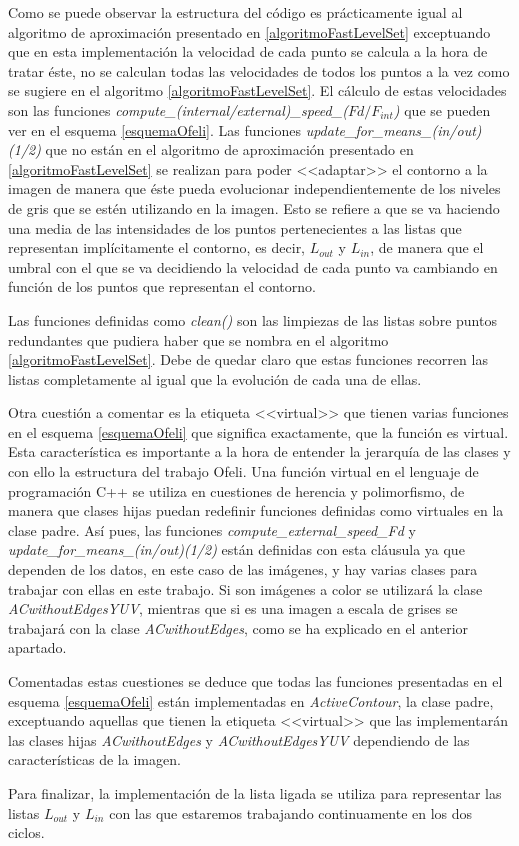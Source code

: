 Como se puede observar la estructura del c\'{o}digo es pr\'{a}cticamente igual al algoritmo de aproximaci\'{o}n presentado en \ref{algoritmoFastLevelSet} exceptuando que en esta implementaci\'{o}n la velocidad de cada punto se calcula a la hora de tratar \'{e}ste, no se calculan todas las velocidades de todos los puntos a la vez como se sugiere en el algoritmo \ref{algoritmoFastLevelSet}. El c\'{a}lculo de estas velocidades son las funciones  \textit{compute\_(internal/external)\_speed\_($Fd/F_{int}$)} que se pueden ver en el esquema \ref{esquemaOfeli}. Las funciones  \textit{update\_for\_means\_(in/out)(1/2)} que no est\'{a}n en el algoritmo de aproximaci\'{o}n presentado en \ref{algoritmoFastLevelSet} se realizan para poder <<adaptar>> el contorno a la imagen de manera que \'{e}ste pueda evolucionar independientemente de los niveles de gris que se est\'{e}n utilizando en la imagen. Esto se refiere a que se va haciendo una media de las intensidades de los puntos pertenecientes a las listas que representan impl\'{i}citamente el contorno, es decir, $L_{out}$ y $L_{in}$, de manera que el umbral con el que se va decidiendo la velocidad de cada punto va cambiando en funci\'{o}n de los puntos que representan el contorno.

Las funciones definidas como \textit{clean()} son las limpiezas de las listas sobre puntos redundantes que pudiera haber que se nombra en el algoritmo \ref{algoritmoFastLevelSet}. Debe de quedar claro que estas funciones recorren las listas completamente al igual que la evoluci\'{o}n de cada una de ellas.

Otra cuesti\'{o}n a comentar es la etiqueta <<virtual>> que tienen varias funciones en el esquema \ref{esquemaOfeli} que significa exactamente, que la funci\'{o}n es virtual. Esta caracter\'{i}stica es importante a la hora de entender la jerarqu\'{i}a de las clases y con ello la estructura del trabajo Ofeli. Una funci\'{o}n virtual en el lenguaje de programaci\'{o}n C++ se utiliza en cuestiones de herencia y polimorfismo, de manera que clases hijas puedan redefinir funciones definidas como virtuales en la clase padre. As\'{i} pues, las funciones  \textit{compute\_external\_speed\_Fd} y \textit{update\_for\_means\_(in/out)(1/2)} est\'{a}n definidas con esta cl\'{a}usula ya que dependen de los datos, en este caso de las im\'{a}genes, y hay varias clases para trabajar con ellas en este trabajo. Si son im\'{a}genes a color se utilizar\'{a} la clase \textit{ACwithoutEdgesYUV}, mientras que si es una imagen a escala de grises se trabajar\'{a} con la clase \textit{ACwithoutEdges}, como se ha explicado en el anterior apartado.

Comentadas estas cuestiones se deduce que todas las funciones presentadas en el esquema \ref{esquemaOfeli} est\'{a}n implementadas en \textit{ActiveContour}, la clase padre, exceptuando aquellas que tienen la etiqueta <<virtual>> que las implementar\'{a}n las clases hijas \textit{ACwithoutEdges} y \textit{ACwithoutEdgesYUV} dependiendo de las caracter\'{i}sticas de la imagen.
 
Para finalizar, la implementaci\'{o}n de la lista ligada se utiliza para representar las listas $L_{out}$ y $L_{in}$ con las que estaremos trabajando continuamente en los dos ciclos.